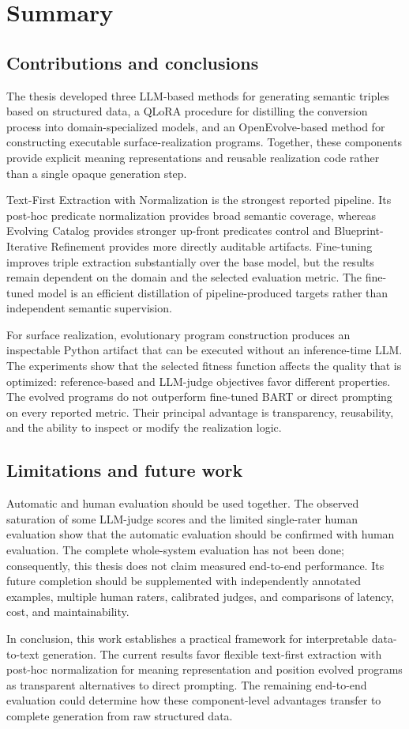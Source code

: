 
\chapter{Summary}

\section{Contributions and conclusions}

The thesis developed three LLM-based methods for generating semantic triples
based on structured data,
a QLoRA procedure for distilling the conversion process into domain-specialized
models, and an OpenEvolve-based method for constructing executable
surface-realization programs. Together, these components provide explicit
meaning representations and reusable realization code rather than a single
opaque generation step.

Text-First Extraction with Normalization is the strongest reported pipeline.
Its post-hoc predicate normalization provides broad semantic coverage, whereas
Evolving Catalog provides stronger up-front
predicates control and Blueprint-Iterative Refinement provides more directly auditable artifacts. Fine-tuning improves
triple extraction substantially over the base model, but the results remain
dependent on the domain and the selected evaluation metric. The fine-tuned model
is an efficient distillation of pipeline-produced targets rather than
independent semantic supervision.

For surface realization, evolutionary program construction produces an
inspectable Python artifact that can be executed without an inference-time LLM.
The experiments show that the selected fitness function affects the quality
that is optimized: reference-based and LLM-judge objectives favor different
properties. The evolved programs do not outperform fine-tuned BART or direct
prompting on every reported metric. Their principal advantage is transparency,
reusability, and the ability to inspect or modify the realization logic.

\section{Limitations and future work}

Automatic and human evaluation should be used together. The observed saturation
of some LLM-judge scores and the limited single-rater human evaluation show that
the automatic evaluation should be confirmed with human evaluation. The complete
whole-system evaluation has not been done; consequently, this thesis
does not claim measured end-to-end performance. Its future completion should be
supplemented with independently annotated examples, multiple human raters,
calibrated judges, and comparisons of latency, cost, and maintainability.

In conclusion, this work establishes a practical framework for interpretable
data-to-text generation. The current results favor flexible text-first
extraction with post-hoc normalization for meaning representation and position
evolved programs as transparent alternatives to direct prompting. The remaining
end-to-end evaluation could determine how these component-level advantages
transfer to complete generation from raw structured data.
